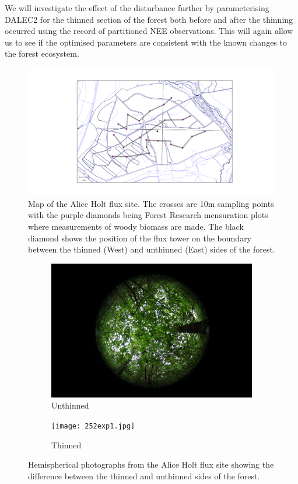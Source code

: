 \documentclass[11pt]{article}
\begin{document}
We will investigate the effect of the disturbance further by parameterising DALEC2 for the thinned section of the forest both before and after the thinning occurred using the record of partitioned NEE observations. This will again allow us to see if the optimised parameters are consistent with the known changes to the forest ecosystem.   

\begin{figure}[!ht]
    \centering
    \includegraphics[width=1.\textwidth]{straitsmap_threet_10m.png}
    \caption{Map of the Alice Holt flux site. The crosses are 10m sampling points with the purple diamonds being Forest Research mensuration plots where measurements of woody biomass are made. The black diamond shows the position of the flux tower on the boundary between the thinned (West) and unthinned (East) sides of the forest.}
    \label{fig:map}
\end{figure}


\begin{figure}[!h]
\centering
\begin{subfigure}{.5\textwidth}
  \centering
  \includegraphics[width=.7\linewidth]{043exp2.jpg}
  \caption{Unthinned}
  \label{fig:sub1}
\end{subfigure}%
\begin{subfigure}{.5\textwidth}
  \centering
  \texttt{[image: 252exp1.jpg]}
  \caption{Thinned}
  \label{fig:sub2}
\end{subfigure}
\caption{Hemispherical photographs from the Alice Holt flux site showing the difference between the thinned and unthinned sides of the forest.}
\label{fig:hemiphotos}
\end{figure}
\end{document}
